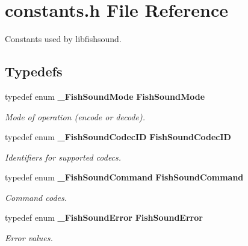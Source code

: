 \section{constants.h File Reference}
\label{constants_8h}
Constants used by libfishsound.  


\subsection*{Typedefs}
\begin{CompactItemize}
\item 
typedef enum {\bf \_\-Fish\-Sound\-Mode} {\bf Fish\-Sound\-Mode}\label{constants_8h_a0}

\begin{CompactList}\small\item\em Mode of operation (encode or decode). \item\end{CompactList}\item 
typedef enum {\bf \_\-Fish\-Sound\-Codec\-ID} {\bf Fish\-Sound\-Codec\-ID}\label{constants_8h_a1}

\begin{CompactList}\small\item\em Identifiers for supported codecs. \item\end{CompactList}\item 
typedef enum {\bf \_\-Fish\-Sound\-Command} {\bf Fish\-Sound\-Command}\label{constants_8h_a2}

\begin{CompactList}\small\item\em Command codes. \item\end{CompactList}\item 
typedef enum {\bf \_\-Fish\-Sound\-Error} {\bf Fish\-Sound\-Error}\label{constants_8h_a3}

\begin{CompactList}\small\item\em Error values. \item\end{CompactList}\end{CompactItemize}
